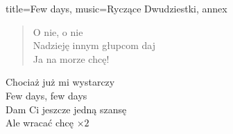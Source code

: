 \begin{song}{title={Few days}, music={Ryczące Dwudziestki}, annex}
\begin{multicols}{2}
\begin{verse}
        O nie, o nie \\
        Nadzieję innym głupcom daj \\
        Ja na morze chcę!
    \end{verse}
    \begin{chorus}
        Chociaż już mi wystarczy \\
        Few days, few days \\
        Dam Ci jeszcze jedną szansę \\
        Ale wracać chcę $\times 2$
    \end{chorus}
\end{multicols}
\end{song}

